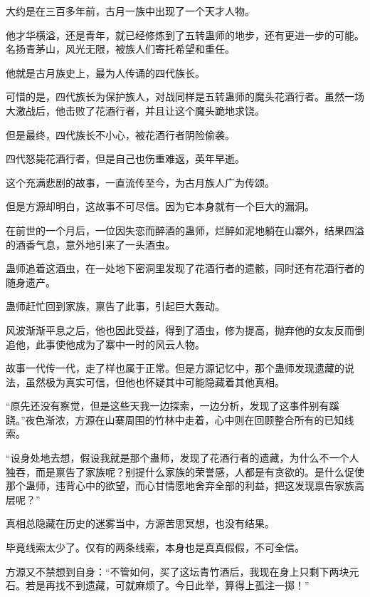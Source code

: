 
\begin{this_body}



大约是在三百多年前，古月一族中出现了一个天才人物。

他才华横溢，还是青年，就已经修炼到了五转蛊师的地步，还有更进一步的可能。名扬青茅山，风光无限，被族人们寄托希望和重任。

他就是古月族史上，最为人传诵的四代族长。

可惜的是，四代族长为保护族人，对战同样是五转蛊师的魔头花酒行者。虽然一场大激战后，他击败了花酒行者，并且让这个魔头跪地求饶。

但是最终，四代族长不小心，被花酒行者阴险偷袭。

四代怒毙花酒行者，但是自己也伤重难返，英年早逝。

这个充满悲剧的故事，一直流传至今，为古月族人广为传颂。

但是方源却明白，这故事不可尽信。因为它本身就有一个巨大的漏洞。

在前世的一个月后，一位因失恋而醉酒的蛊师，烂醉如泥地躺在山寨外，结果四溢的酒香气息，意外地引来了一头酒虫。

蛊师追着这酒虫，在一处地下密洞里发现了花酒行者的遗骸，同时还有花酒行者的随身遗产。

蛊师赶忙回到家族，禀告了此事，引起巨大轰动。

风波渐渐平息之后，他也因此受益，得到了酒虫，修为提高，抛弃他的女友反而倒追他，此事使他成为了寨中一时的风云人物。

故事一代传一代，走了样也属于正常。但是方源记忆中，那个蛊师发现遗藏的说法，虽然极为真实可信，但他也怀疑其中可能隐藏着其他真相。

“原先还没有察觉，但是这些天我一边探索，一边分析，发现了这事件别有蹊跷。”夜色渐浓，方源在山寨周围的竹林中走着，心中则在回顾整合所有的已知线索。

“设身处地去想，假设我就是那个蛊师，发现了花酒行者的遗藏，为什么不一个人独吞，而是禀告了家族呢？别提什么家族的荣誉感，人都是有贪欲的。是什么促使那个蛊师，违背心中的欲望，而心甘情愿地舍弃全部的利益，把这发现禀告家族高层呢？”

真相总隐藏在历史的迷雾当中，方源苦思冥想，也没有结果。

毕竟线索太少了。仅有的两条线索，本身也是真真假假，不可全信。

方源又不禁想到自身：“不管如何，买了这坛青竹酒后，我现在身上只剩下两块元石。若是再找不到遗藏，可就麻烦了。今日此举，算得上孤注一掷！”


\end{this_body}
